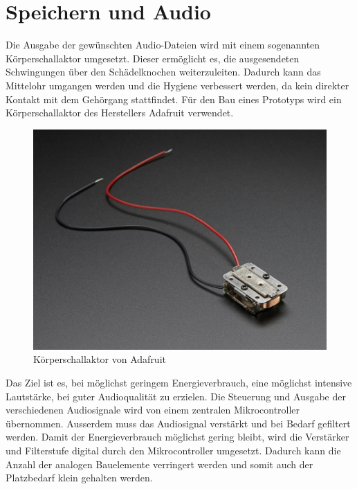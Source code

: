 \section{Speichern und Audio}

Die Ausgabe der gewünschten Audio-Dateien wird mit einem sogenannten Körperschallaktor umgesetzt. Dieser ermöglicht es, die ausgesendeten Schwingungen über den Schädelknochen weiterzuleiten. Dadurch kann das Mittelohr umgangen werden und die Hygiene verbessert werden, da kein direkter Kontakt mit dem Gehörgang stattfindet. Für den Bau eines Prototyps wird ein Körperschallaktor des Herstellers Adafruit verwendet. 

\begin{figure}[H]
\begin{center}
	\includegraphics[width=160mm]{data/Schallaktor.png}
	\caption{Körperschallaktor von Adafruit}
	\label{fig:schallaktorAdafruit}
\end{center}
\end{figure}

Das Ziel ist es, bei möglichst geringem Energieverbrauch, eine möglichst intensive Lautstärke, bei guter Audioqualität zu erzielen.
Die Steuerung und Ausgabe der verschiedenen Audiosignale wird von einem zentralen Mikrocontroller übernommen. Ausserdem muss das Audiosignal verstärkt und bei Bedarf gefiltert werden. Damit der Energieverbrauch möglichst gering bleibt, wird die Verstärker und Filterstufe digital durch den Mikrocontroller umgesetzt. Dadurch kann die Anzahl der analogen Bauelemente verringert werden und somit auch der Platzbedarf klein gehalten werden.

